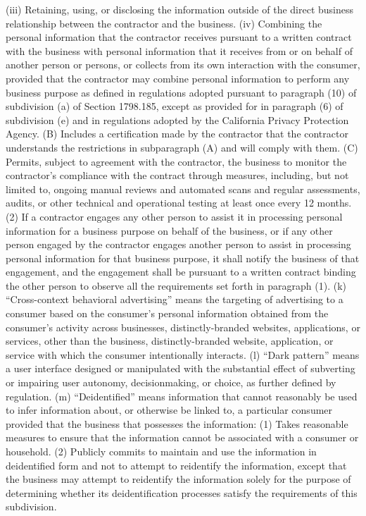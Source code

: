 (iii) Retaining, using, or disclosing the information outside of the direct business relationship between the contractor and the business.
(iv) Combining the personal information that the contractor receives pursuant to a written contract with the business with personal information that it receives from or on behalf of another person or persons, or collects from its own interaction with the consumer, provided that the contractor may combine personal information to perform any business purpose as defined in regulations adopted pursuant to paragraph (10) of subdivision (a) of Section 1798.185, except as provided for in paragraph (6) of subdivision (e) and in regulations adopted by the California Privacy Protection Agency.
(B) Includes a certification made by the contractor that the contractor understands the restrictions in subparagraph (A) and will comply with them.
(C) Permits, subject to agreement with the contractor, the business to monitor the contractor’s compliance with the contract through measures, including, but not limited to, ongoing manual reviews and automated scans and regular assessments, audits, or other technical and operational testing at least once every 12 months.
(2) If a contractor engages any other person to assist it in processing personal information for a business purpose on behalf of the business, or if any other person engaged by the contractor engages another person to assist in processing personal information for that business purpose, it shall notify the business of that engagement, and the engagement shall be pursuant to a written contract binding the other person to observe all the requirements set forth in paragraph (1).
(k) “Cross-context behavioral advertising” means the targeting of advertising to a consumer based on the consumer’s personal information obtained from the consumer’s activity across businesses, distinctly-branded websites, applications, or services, other than the business, distinctly-branded website, application, or service with which the consumer intentionally interacts.
(l) “Dark pattern” means a user interface designed or manipulated with the substantial effect of subverting or impairing user autonomy, decisionmaking, or choice, as further defined by regulation.
(m) “Deidentified” means information that cannot reasonably be used to infer information about, or otherwise be linked to, a particular consumer provided that the business that possesses the information:
(1) Takes reasonable measures to ensure that the information cannot be associated with a consumer or household.
(2) Publicly commits to maintain and use the information in deidentified form and not to attempt to reidentify the information, except that the business may attempt to reidentify the information solely for the purpose of determining whether its deidentification processes satisfy the requirements of this subdivision.
